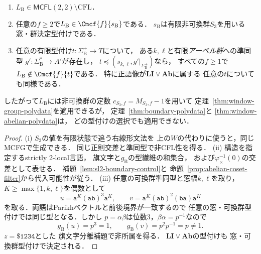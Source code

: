 \begin{proposition}
\label{prop:nonabelian-needed-target}
\begin{enumerate}[label=\textup{(\roman*)},leftmargin=*]
\item $L_{\mathrm B}\in\mathsf{MCFL}(2,2)\setminus\mathrm{CFL}$．
\item 任意の$f\ge2$で$L_{\mathrm B}\in\Cmcf{f}{s_{\mathrm B}}$である．
$s_{\mathrm B}$は有限非可換群$S_3$を用いる
窓・群決定型付けである．
\item 任意の有限型付け$t:\Sigma_{\mathrm B}^+\to T$について，
ある$k,\ell$と有限\emph{アーベル群}への準同型
$g':\Sigma_{\mathrm B}^*\to A'$が存在し，
$t\preceq(s_{k,\ell},g'|_{\Sigma_{\mathrm B}^+})$なら，
すべての$f\ge1$で$L_{\mathrm B}\notin\Cmcf{f}{t}$である．
特に正語像が$\mathbf{LI}\vee\mathbf{Ab}$に属する
任意の$t$についても同様である．
\end{enumerate}
したがって$L_{\mathrm B}$には非可換群の定数
$c_{S_3,f}=M_{S_3,f}-1$を用いて
定理~\ref{thm:window-group-polydata}を適用できるが，
定理~\ref{thm:boundary-polydata}と
\ref{thm:window-abelian-polydata}は，
どの型付けの選択でも適用できない．
\end{proposition}
\begin{proof}
(i) $S_3$の値を有限状態で追う右線形文法を
上の$W$の代わりに使うと，同じMCFGで生成できる．
同じ正則交差と準同型で非CFL性を得る．
(ii) 構造を指定するstrictly 2-local言語，
旗文字と$g_{\mathrm B}$の型繊維の和集合，
および$\varphi_\times^{-1}(0)$の交差として表せる．
補題~\ref{lem:sl2-boundary-control}と
命題~\ref{prop:abelian-coset-filter}から代入可能性が従う．
(iii) 任意の可換群準同型と窓幅$k,\ell$を取り，
$K\ge\max\{1,k,\ell\}$を偶数として
\[
 u=\mathtt a^K(\mathtt{ab})^3\mathtt a^K,\qquad
 v=\mathtt a^K(\mathtt{ab})^2(\mathtt{ba})\mathtt a^K
\]
を取る．両語はParikhベクトルと前後境界が一致するので
任意の窓・可換群型付けでは同じ型となる．しかし
$p=\alpha\beta$は位数3，$\beta\alpha=p^{-1}$なので
\[
 g_{\mathrm B}(u)=p^3=1,\qquad
 g_{\mathrm B}(v)=p^2p^{-1}=p\ne1.
\]
$z=\mathtt\$\mathtt{1234}$とした
旗文字分離補題で非所属を得る．
$\mathbf{LI}\vee\mathbf{Ab}$の型付けも
窓・可換群型付けで決定される．
\end{proof}
